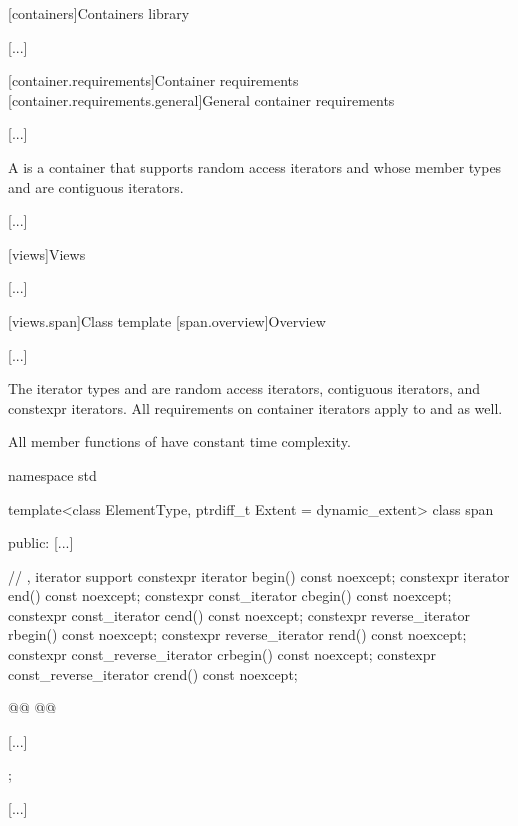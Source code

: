 
[containers]{Containers library}

[...]

\setcounter{section}{1}
[container.requirements]{Container requirements}
[container.requirements.general]{General container requirements}

[...]


\setcounter{Paras}{12}
\pnum
{}%
A 
is a container that supports random access iterators
and whose member types  and 
are contiguous iterators.

[...]

\setcounter{section}{6}
[views]{Views}

[...]

\setcounter{subsection}{2}
[views.span]{Class template }
[span.overview]{Overview}

[...]


\setcounter{Paras}{1}
\pnum
The iterator types  and  are
random access iterators,
contiguous iterators, and
constexpr iterators.
All requirements on container iterators apply to
 and  as well.

\pnum
All member functions of  have constant time complexity.

%
\begin{codeblock}
namespace std {
  template<class ElementType, ptrdiff_t Extent = dynamic_extent>
  class span {
  public:
    [...]

    // , iterator support
    constexpr iterator begin() const noexcept;
    constexpr iterator end() const noexcept;
    constexpr const_iterator cbegin() const noexcept;
    constexpr const_iterator cend() const noexcept;
    constexpr reverse_iterator rbegin() const noexcept;
    constexpr reverse_iterator rend() const noexcept;
    constexpr const_reverse_iterator crbegin() const noexcept;
    constexpr const_reverse_iterator crend() const noexcept;

    @@
    @@

    [...]
  };
}
\end{codeblock}

[...]
